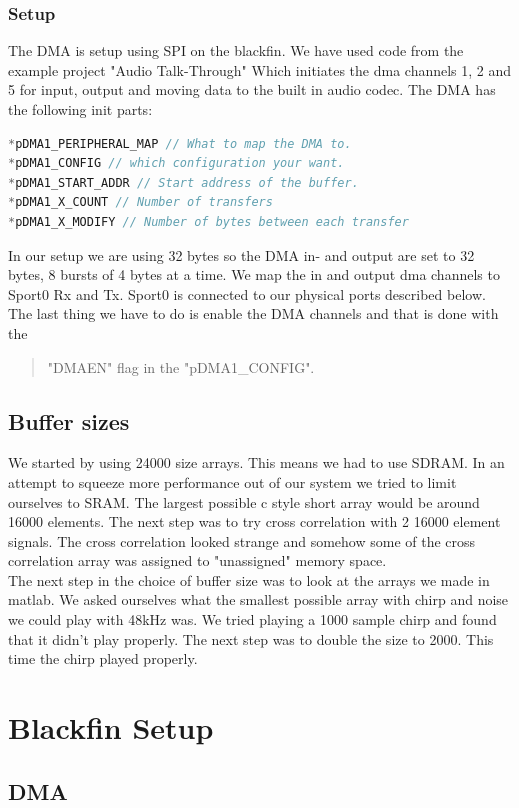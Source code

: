 \subsubsection{Setup}
The DMA is setup using SPI on the blackfin. We have used code from the example project "Audio Talk-Through" Which initiates the dma channels 1, 2 and 5 for input, output and moving data to the built in audio codec. The DMA has the following init parts:
\begin{lstlisting}[language=C]
*pDMA1_PERIPHERAL_MAP // What to map the DMA to.
*pDMA1_CONFIG // which configuration your want.
*pDMA1_START_ADDR // Start address of the buffer.
*pDMA1_X_COUNT // Number of transfers
*pDMA1_X_MODIFY // Number of bytes between each transfer
\end{lstlisting}
In our setup we are using 32 bytes so the DMA in- and output are set to 32 bytes, 8 bursts of 4 bytes at a time. We map the in and output dma channels to Sport0 Rx and Tx. Sport0 is connected to our physical ports described below. The last thing we have to do is enable the DMA channels and that is done with the \begin{quote}
"DMAEN" flag in the "pDMA1\_CONFIG".
\end{quote}

\subsection{Buffer sizes}
We started by using 24000 size arrays. This means we had to use SDRAM. In an attempt to squeeze more performance out of our system we tried to limit ourselves to SRAM. The largest possible c style short array would be around 16000 elements. The next step was to try cross correlation with 2 16000 element signals. The cross correlation looked strange and somehow some of the cross correlation array was assigned to "unassigned" memory space.\\
The next step in the choice of buffer size was to look at the arrays we made in matlab. We asked ourselves what the smallest possible array with chirp and noise we could play with 48kHz was. We tried playing a 1000 sample chirp and found that it didn't play properly. The next step was to double the size to 2000. This time the chirp played properly.\\


\section{Blackfin Setup}
\subsection{DMA}

